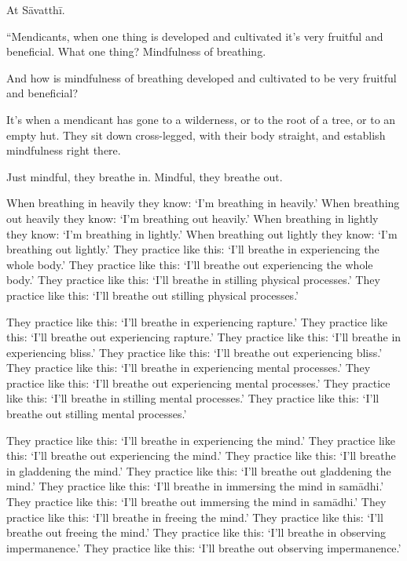 \documentclass[12pt,openany]{book}%
\begin{document}
At \textsanskrit{Sāvatthī}. 

“Mendicants, when one thing is developed and cultivated it’s very fruitful and beneficial. What one thing? Mindfulness of breathing. 

And how is mindfulness of breathing developed and cultivated to be very fruitful and beneficial? 

It’s when a mendicant has gone to a wilderness, or to the root of a tree, or to an empty hut. They sit down cross-legged, with their body straight, and establish mindfulness right there. 

Just mindful, they breathe in. Mindful, they breathe out. 

When breathing in heavily they know: ‘I’m breathing in heavily.’ When breathing out heavily they know: ‘I’m breathing out heavily.’ When breathing in lightly they know: ‘I’m breathing in lightly.’ When breathing out lightly they know: ‘I’m breathing out lightly.’ They practice like this: ‘I’ll breathe in experiencing the whole body.’ They practice like this: ‘I’ll breathe out experiencing the whole body.’ They practice like this: ‘I’ll breathe in stilling physical processes.’ They practice like this: ‘I’ll breathe out stilling physical processes.’ 

They practice like this: ‘I’ll breathe in experiencing rapture.’ They practice like this: ‘I’ll breathe out experiencing rapture.’ They practice like this: ‘I’ll breathe in experiencing bliss.’ They practice like this: ‘I’ll breathe out experiencing bliss.’ They practice like this: ‘I’ll breathe in experiencing mental processes.’ They practice like this: ‘I’ll breathe out experiencing mental processes.’ They practice like this: ‘I’ll breathe in stilling mental processes.’ They practice like this: ‘I’ll breathe out stilling mental processes.’ 

They practice like this: ‘I’ll breathe in experiencing the mind.’ They practice like this: ‘I’ll breathe out experiencing the mind.’ They practice like this: ‘I’ll breathe in gladdening the mind.’ They practice like this: ‘I’ll breathe out gladdening the mind.’ They practice like this: ‘I’ll breathe in immersing the mind in \textsanskrit{samādhi}.’ They practice like this: ‘I’ll breathe out immersing the mind in \textsanskrit{samādhi}.’ They practice like this: ‘I’ll breathe in freeing the mind.’ They practice like this: ‘I’ll breathe out freeing the mind.’ They practice like this: ‘I’ll breathe in observing impermanence.’ They practice like this: ‘I’ll breathe out observing impermanence.’ 
\end{document}
